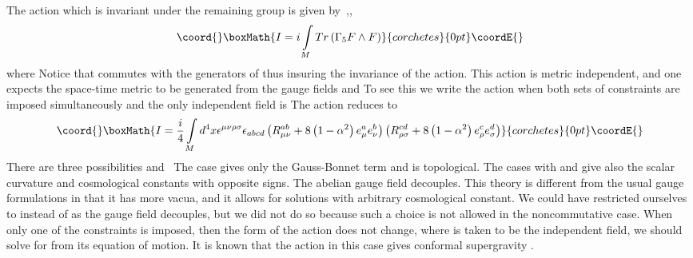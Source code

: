 \documentclass[a4paper,a4paper]{article}
\begin{document}
The action which is invariant under the remaining \coordHE{} group
is given by\ \cite{mcdowel},\cite{ortho},
\[\coord{}\boxMath{
I=i\int\limits_{M}Tr\left(  \Gamma_{5}F\wedge F\right)
}{corchetes}{0pt}\coordE{}\]
where \coordHE{} Notice that
\coordHE{} commutes with the generators \coordHE{} of \coordHE{} thus insuring the invariance of the
action. This action is metric independent, and one expects the space-time
metric to be generated from the gauge fields \coordHE{} and \coordHE{}
To see this we write the action when both sets of constraints are imposed
simultaneously and the only independent field is \coordHE{} The action
reduces to
\[\coord{}\boxMath{
I=\frac{i}{4}\int\limits_{M}d^{4}x\epsilon^{\mu\nu\rho\sigma}\epsilon
_{abcd}\left(  R_{\mu\nu}^{ab}+8\left(  1-\alpha^{2}\right)  e_{\mu}^{a}%
e_{\nu}^{b}\right)  \left(  R_{\rho\sigma}^{cd}+8\left(  1-\alpha^{2}\right)
e_{\rho}^{c}e_{\sigma}^{d}\right)
}{corchetes}{0pt}\coordE{}\]
There are three possibilities \coordHE{}  \coordHE{} and \coordHE{} \ The case \coordHE{} gives only the Gauss-Bonnet term and is topological. The
cases with \coordHE{} and \coordHE{} give
also the scalar curvature and cosmological constants with opposite signs. The
abelian gauge field \coordHE{}decouples. This theory is different from
the usual gauge formulations in that it has more vacua, and it allows for
solutions with arbitrary cosmological constant. We could have restricted
ourselves to \coordHE{} instead of \coordHE{} as the gauge field \coordHE{}
decouples, but we did not do so because such a choice is not allowed in the
noncommutative case. When only one of the constraints is imposed, then the
form of the action does not change, where \coordHE{} is taken to be the
independent field, we should solve for \coordHE{} from its equation of
motion. It is known that the action in this case gives conformal supergravity
\cite{physreport}.
\end{document}
